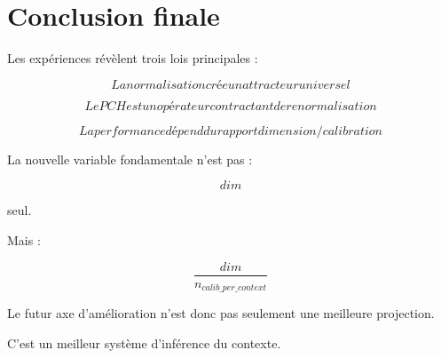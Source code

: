 \documentclass{article}
\begin{document}
\section{Conclusion finale}

Les expériences révèlent trois lois principales :

\[
\boxed{
La normalisation crée un attracteur universel
}
\]


\[
\boxed{
Le PCH est un opérateur contractant de renormalisation
}
\]


\[
\boxed{
La performance dépend du rapport dimension/calibration
}
\]


La nouvelle variable fondamentale n'est pas :

\[
dim
\]

seul.


Mais :

\[
\boxed{
\frac{dim}{n_{calib\_per\_context}}
}
\]


Le futur axe d'amélioration n'est donc pas seulement une meilleure projection.

C'est un meilleur système d'inférence du contexte.
\end{document}
